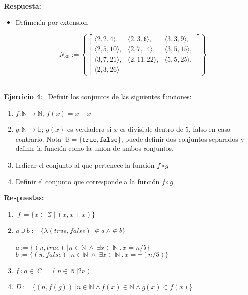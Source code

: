 \documentclass[10pt,a4paper]{article}
\begin{document}
  	
  	\
  	
  	 {\bf Respuesta:}
  	 
  	 \begin{itemize}
  	   	
   	\item Definición por extensión 
   	
   	$$
   	{N}_{30}:= \left\{
   	\begin{bmatrix}
   	\langle 2,2,4 \rangle , & \langle 2,3,6 \rangle, & \langle 3,3,9 \rangle, \\
   	\langle 2,5,10 \rangle, & \langle 2,7,14 \rangle, & \langle 3,5,15 \rangle, \\
   	\langle 3,7,21 \rangle, & \langle 2,11,22 \rangle, & \langle 5,5,25 \rangle, \\
   	\langle 2,3,26 \rangle
   	\end{bmatrix}
   	\right\}
   	$$ \\
   	
  
  	 \end{itemize} 
   
    {\bf Ejercicio 4:} 
  \
  Definir los conjuntos de las siguientes funciones:
  
  \begin{enumerate}
  	\item{$f:\mathbb{N}\rightarrow\mathbb{N}$; $f(x)=x+x$}
  	\item{$g:\mathbb{N}\rightarrow\mathbb{B}$; $g(x)$ es verdadero si
  		$x$ es divisible dentro de $5$, falso en caso contrario. Nota: $\mathbb{B}=
  		\{\mathtt{true},\mathtt{false}\}$, puede definir dos conjuntos separados y
  		definir la funci\'on como la union de ambos conjuntos.}
  	\item{Indicar el conjunto al que pertenece la funci\'on $f\circ g$}
  	\item{Definir el conjunto que corresponde a la funci\'on $f\circ g$}
  \end{enumerate}
  
      {\bf Respuestas:}
       
  \begin{enumerate}
  	
  	\item  $ \ f \  = \{ x \in \ \mathtt{N} \ |\  (x , x+x) \} $ 
  	
  	\item {$a \cup b:=\{ \lambda (true,false)\ \in a\ \wedge  \in b \}$} 
  	\\
  	\\ {$a:=\{(n,true)\ | n \in \mathbb{N} \ \wedge\ \exists x \in \mathbb{N}\ .\ x=n/5 \}$}
  	\\ {$b:=\{(n,false)\ | n \in \mathbb{N} \ \wedge\ \exists x \in \mathbb{N}\ .\ x= \neg (n/5) \}$}
  	
  	\item {$f\circ g \in \ C=( n \in \ \mathtt{N} \ | 2n ) $}
  	
  	\item 	{$D:=\{(n,f(g)) \ | n \in \mathbb{N} \wedge f(x)\in\mathbb{N} \wedge g(x) \subset f(x) \}$}
  	
  	
  \end{enumerate}	
\end{document}
